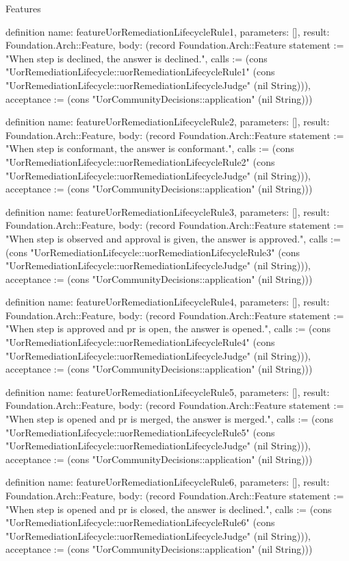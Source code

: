 \begin{lexlean}{Features}
\begin{semanticmodule}
definition{
  name: featureUorRemediationLifecycleRule1,
  parameters: [],
  result: Foundation.Arch::Feature,
  body: (record Foundation.Arch::Feature {statement := "When step is declined, the answer is declined.", calls := (cons "UorRemediationLifecycle::uorRemediationLifecycleRule1" (cons "UorRemediationLifecycle::uorRemediationLifecycleJudge" (nil String))), acceptance := (cons "UorCommunityDecisions::application" (nil String))})
}

definition{
  name: featureUorRemediationLifecycleRule2,
  parameters: [],
  result: Foundation.Arch::Feature,
  body: (record Foundation.Arch::Feature {statement := "When step is conformant, the answer is conformant.", calls := (cons "UorRemediationLifecycle::uorRemediationLifecycleRule2" (cons "UorRemediationLifecycle::uorRemediationLifecycleJudge" (nil String))), acceptance := (cons "UorCommunityDecisions::application" (nil String))})
}

definition{
  name: featureUorRemediationLifecycleRule3,
  parameters: [],
  result: Foundation.Arch::Feature,
  body: (record Foundation.Arch::Feature {statement := "When step is observed and approval is given, the answer is approved.", calls := (cons "UorRemediationLifecycle::uorRemediationLifecycleRule3" (cons "UorRemediationLifecycle::uorRemediationLifecycleJudge" (nil String))), acceptance := (cons "UorCommunityDecisions::application" (nil String))})
}

definition{
  name: featureUorRemediationLifecycleRule4,
  parameters: [],
  result: Foundation.Arch::Feature,
  body: (record Foundation.Arch::Feature {statement := "When step is approved and pr is open, the answer is opened.", calls := (cons "UorRemediationLifecycle::uorRemediationLifecycleRule4" (cons "UorRemediationLifecycle::uorRemediationLifecycleJudge" (nil String))), acceptance := (cons "UorCommunityDecisions::application" (nil String))})
}

definition{
  name: featureUorRemediationLifecycleRule5,
  parameters: [],
  result: Foundation.Arch::Feature,
  body: (record Foundation.Arch::Feature {statement := "When step is opened and pr is merged, the answer is merged.", calls := (cons "UorRemediationLifecycle::uorRemediationLifecycleRule5" (cons "UorRemediationLifecycle::uorRemediationLifecycleJudge" (nil String))), acceptance := (cons "UorCommunityDecisions::application" (nil String))})
}

definition{
  name: featureUorRemediationLifecycleRule6,
  parameters: [],
  result: Foundation.Arch::Feature,
  body: (record Foundation.Arch::Feature {statement := "When step is opened and pr is closed, the answer is declined.", calls := (cons "UorRemediationLifecycle::uorRemediationLifecycleRule6" (cons "UorRemediationLifecycle::uorRemediationLifecycleJudge" (nil String))), acceptance := (cons "UorCommunityDecisions::application" (nil String))})
}


\end{semanticmodule}
\end{lexlean}
